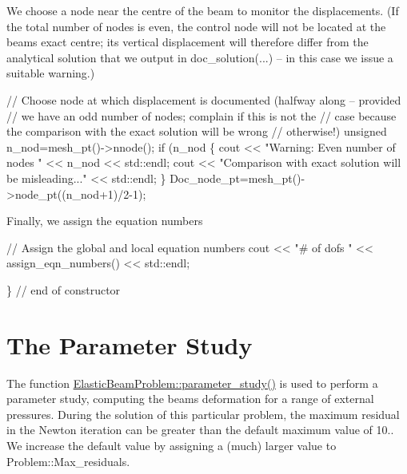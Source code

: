 We choose a node near the centre of the beam to monitor the displacements. (If the total number of nodes is even, the control node will not be located at the beam\textquotesingle{}s exact centre; its vertical displacement will therefore differ from the analytical solution that we output in {\ttfamily doc\+\_\+solution}(...) -- in this case we issue a suitable warning.) 
\begin{DoxyCodeInclude}
 \textcolor{comment}{// Choose node at which displacement is documented (halfway along -- provided}
 \textcolor{comment}{// we have an odd number of nodes; complain if this is not the}
 \textcolor{comment}{// case because the comparison with the exact solution will be wrong }
 \textcolor{comment}{// otherwise!)}
 \textcolor{keywordtype}{unsigned} n\_nod=mesh\_pt()->nnode();
 \textcolor{keywordflow}{if} (n\_nod%
  \{
   cout << \textcolor{stringliteral}{"Warning: Even number of nodes "} << n\_nod << std::endl;
   cout << \textcolor{stringliteral}{"Comparison with exact solution will be misleading..."} << std::endl;
  \}
 Doc\_node\_pt=mesh\_pt()->node\_pt((n\_nod+1)/2-1);

\end{DoxyCodeInclude}


Finally, we assign the equation numbers 
\begin{DoxyCodeInclude}
 \textcolor{comment}{// Assign the global and local equation numbers}
 cout << \textcolor{stringliteral}{"# of dofs "} << assign\_eqn\_numbers() << std::endl;

\} \textcolor{comment}{// end of constructor}

\end{DoxyCodeInclude}




 

\hypertarget{index_param}{}\section{The Parameter Study}\label{index_param}
The function \hyperlink{classElasticBeamProblem_a2da3cb02ce953da67fb27742e20774a5}{Elastic\+Beam\+Problem\+::parameter\+\_\+study()} is used to perform a parameter study, computing the beam\textquotesingle{}s deformation for a range of external pressures. During the solution of this particular problem, the maximum residual in the Newton iteration can be greater than the default maximum value of 10.. We increase the default value by assigning a (much) larger value to {\ttfamily Problem\+::\+Max\+\_\+residuals}.

